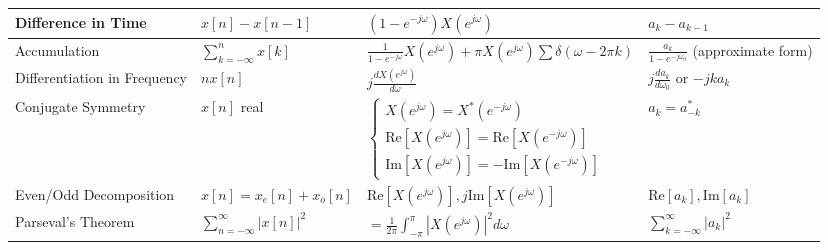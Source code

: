 \documentclass[8pt]{extarticle}
\begin{document}
\begin{table}[h]
\begin{tabular}{|l|l|l|l|}
        Difference in Time           & $x[n] - x[n - 1]$                            & $(1 - e^{-j\omega}) X(e^{j\omega})$                                                            & $a_k - a_{k-1}$                                     \\ \hline
        Accumulation                 & $\sum_{k = -\infty}^{n} x[k]$                & $\frac{1}{1 - e^{-j\omega}} X(e^{j\omega}) + \pi X(e^{j\omega}) \sum \delta(\omega - 2\pi k)$  & $\frac{a_k}{1 - e^{-j\omega_0}}$ (approximate form) \\ \hline
        Differentiation in Frequency & $n x[n]$                                     & $j \frac{d X(e^{j\omega})}{d\omega}$                                                           & $j \frac{d a_k}{d\omega_0}$ or $-j k a_k$           \\ \hline
        Conjugate Symmetry           & $x[n]$ real                                  & $\begin{cases}
                                                                                               X(e^{j\omega}) = X^*(e^{-j\omega})                     \\
                                                                                               \text{Re}[X(e^{j\omega})] = \text{Re}[X(e^{-j\omega})] \\
                                                                                               \text{Im}[X(e^{j\omega})] = -\text{Im}[X(e^{-j\omega})]
                                                                                           \end{cases}$ & $a_k = a^*_{-k}$                                                         \\ \hline
        Even/Odd Decomposition       & $x[n] = x_e[n] + x_o[n]$                     & $\text{Re}[X(e^{j\omega})], j \text{Im}[X(e^{j\omega})]$                                       & $\text{Re}[a_k], \text{Im}[a_k]$                    \\ \hline
        Parseval's Theorem           & $\sum_{n=-\infty}^{\infty} |x[n]|^2$         & $= \frac{1}{2\pi} \int_{-\pi}^{\pi} |X(e^{j\omega})|^2 d\omega$                                & $\sum_{k=-\infty}^{\infty} |a_k|^2$                 \\ \hline
    \end{tabular}
\end{table}
\end{document}
